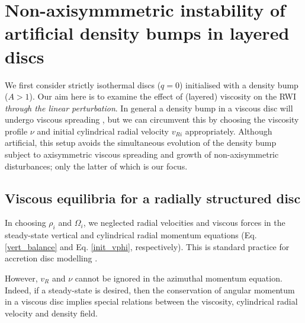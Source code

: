 \section{Non-axisymmmetric instability of artificial density bumps in
  layered discs}\label{density_bump} 
We first consider strictly isothermal discs ($q=0$) initialised with a
density bump ($A>1$). Our aim here
is to examine the effect of (layered) viscosity on the RWI 
\emph{through the linear perturbation}. 
In general a density bump in a viscous disc will undergo viscous
spreading \citep{lyndenbell74}, but we can circumvent this 
by choosing the viscosity profile $\nu$ and initial cylindrical radial
velocity $v_{Ri}$ appropriately. 
Although artificial, this setup avoids 
the simultaneous evolution of the density bump subject to
axisymmetric viscous spreading and growth of
non-axisymmetric disturbances; only the latter of which is our focus. 


\subsection{Viscous equilibria for a radially structured
  disc}\label{visc_eq}  
In choosing $\rho_i$ and $\Omega_i$, we neglected radial
velocities and viscous forces in the steady-state vertical and
cylindrical radial momentum equations (Eq. \ref{vert_balance} and
Eq. \ref{init_vphi}, respectively). This is standard practice for
accretion disc modelling \citep[e.g.][]{takeuchi02}.   

However, $v_{R}$ and $\nu$ cannot be ignored in the azimuthal
momentum equation. Indeed, if a steady-state is desired, then the
conservation of angular momentum in a viscous disc implies special
relations between the viscosity, cylindrical radial velocity and
density field. 


